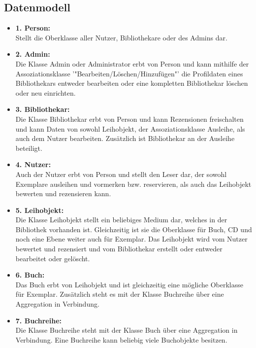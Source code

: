 \documentclass[fontsize=12pt,paper=a4,twoside]{scrartcl}
\begin{document}
\subsection{Datenmodell}
\begin{itemize}
 \item \textbf{1. Person:}\\
  Stellt die Oberklasse aller Nutzer, Bibliothekare oder 
  des Admins dar.

\item \textbf{2. Admin:}\\
Die Klasse Admin oder Administrator erbt von Person und kann mithilfe der    Assoziationsklasse '"Bearbeiten/Löschen/Hinzufügen"' die Profildaten eines
Bibliothekars entweder bearbeiten oder eine kompletten Bibliothekar löschen 
oder  neu einrichten.
 
\item \textbf{3. Bibliothekar:}\\
Die Klasse Bibliothekar erbt von Person und kann Rezensionen freischalten und
kann Daten von sowohl Leihobjekt, der Assoziationsklasse Ausleihe, als auch 
dem Nutzer bearbeiten. Zusätzlich ist Bibliothekar an der Ausleihe beteiligt.

\item \textbf{4. Nutzer:}\\
Auch der Nutzer erbt von Person und stellt den Leser dar, der sowohl Exemplare
ausleihen und vormerken bzw. reservieren, als auch das Leihobjekt bewerten und 
rezensieren kann.

\item \textbf{5. Leihobjekt:}\\
Die Klasse Leihobjekt stellt ein beliebiges Medium dar, welches in der 
Bibliothek vorhanden ist. Gleichzeitig ist sie die Oberklasse für Buch,
CD und noch eine Ebene weiter auch für Exemplar. Das Leihobjekt wird vom Nutzer
bewertet und rezensiert und vom Bibliothekar erstellt oder entweder bearbeitet 
oder gelöscht.

\item \textbf{6. Buch:}\\
Das Buch erbt von Leihobjekt und ist gleichzeitig eine mögliche Oberklasse
für Exemplar. Zusätzlich steht es mit der Klasse Buchreihe über eine Aggregation
in Verbindung. 

\item \textbf{7. Buchreihe:}\\
Die Klasse Buchreihe steht mit der Klasse Buch über eine Aggregation in Verbindung.
Eine Buchreihe kann beliebig viele Buchobjekte besitzen.
 

\end{itemize}
\end{document}
